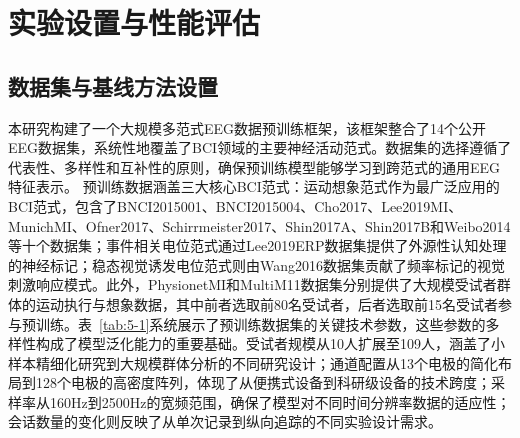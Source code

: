 \section{实验设置与性能评估}
\subsection{数据集与基线方法设置}
本研究构建了一个大规模多范式EEG数据预训练框架，该框架整合了14个公开EEG数据集，系统性地覆盖了BCI领域的主要神经活动范式。数据集的选择遵循了代表性、多样性和互补性的原则，确保预训练模型能够学习到跨范式的通用EEG特征表示。
预训练数据涵盖三大核心BCI范式：运动想象范式作为最广泛应用的BCI范式，包含了BNCI2015001\cite{faller2012autocalibration}、BNCI2015004\cite{scherer2015individually}、Cho2017\cite{cho2017eeg}、Lee2019MI\cite{lee2019eeg}、MunichMI\cite{grosse2009beamforming}、Ofner2017\cite{ofner2017upper}、Schirrmeister2017\cite{schirrmeister2017deep}、Shin2017A\cite{shin2016open}、Shin2017B\cite{shin2016open}和Weibo2014\cite{yi2014evaluation}等十个数据集；事件相关电位范式通过Lee2019ERP\cite{lee2019eeg}数据集提供了外源性认知处理的神经标记；稳态视觉诱发电位范式则由Wang2016\cite{wang2016benchmark}数据集贡献了频率标记的视觉刺激响应模式。此外，PhysionetMI\cite{goldberger_physiobank_2000, schalk2004bci2000}和MultiM11\cite{jeong_multimodal_2020}数据集分别提供了大规模受试者群体的运动执行与想象数据，其中前者选取前80名受试者，后者选取前15名受试者参与预训练。表~\ref{tab:5-1}系统展示了预训练数据集的关键技术参数，这些参数的多样性构成了模型泛化能力的重要基础。受试者规模从10人扩展至109人，涵盖了小样本精细化研究到大规模群体分析的不同研究设计；通道配置从13个电极的简化布局到128个电极的高密度阵列，体现了从便携式设备到科研级设备的技术跨度；采样率从160Hz到2500Hz的宽频范围，确保了模型对不同时间分辨率数据的适应性；会话数量的变化则反映了从单次记录到纵向追踪的不同实验设计需求。

